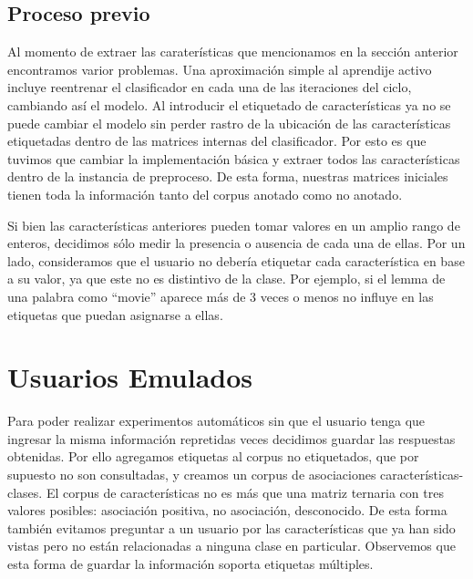 

\subsection{Proceso previo}

Al momento de extraer las caraterísticas que mencionamos en la sección anterior encontramos varior problemas. Una aproximación simple al aprendije activo incluye reentrenar el clasificador en cada una de las iteraciones del ciclo, cambiando así el modelo. Al introducir el etiquetado de características ya no se puede cambiar el modelo sin perder rastro de la ubicación de las características etiquetadas dentro de las matrices internas del clasificador. Por esto es que tuvimos que cambiar la implementación básica y extraer todos las características dentro de la instancia de preproceso. De esta forma, nuestras matrices iniciales tienen toda la información tanto del corpus anotado como no anotado.

Si bien las características anteriores pueden tomar valores en un amplio rango de enteros, decidimos sólo medir la presencia o ausencia de cada una de ellas. Por un lado, consideramos que el usuario no debería etiquetar cada característica en base a su valor, ya que este no es distintivo de la clase. Por ejemplo, si el lemma de una palabra como ``movie'' aparece más de 3 veces o menos no influye en las etiquetas que puedan asignarse a ellas.

\section{Usuarios Emulados}

Para poder realizar experimentos automáticos sin que el usuario tenga que ingresar la misma información repretidas veces decidimos guardar las respuestas obtenidas. Por ello agregamos etiquetas al corpus no etiquetados, que por supuesto no son consultadas, y creamos un corpus de asociaciones características-clases.
El corpus de características no es más que una matriz ternaria con tres valores posibles: asociación positiva, no asociación, desconocido. De esta forma también evitamos preguntar a un usuario por las características que ya han sido vistas pero no están relacionadas a ninguna clase en particular. Observemos que esta forma de guardar la información soporta etiquetas múltiples.

